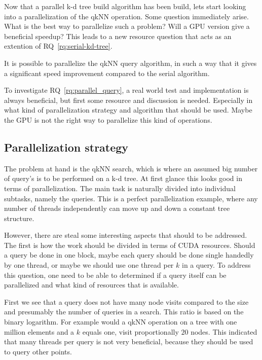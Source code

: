 





Now that a parallel k-d tree build algorithm has been build, lets start looking into a parallelization of the qkNN operation. Some question immediately arise. What is the best way to parallelize such a problem? Will a GPU version give a beneficial speedup? This leads to a new resource question that acts as an extention of RQ~\ref{rq:serial-kd-tree}.


\begin{myrq}
\label{rq:parallel_query}
    It is possible to parallelize the qkNN query algorithm, in such a way that it gives a significant speed improvement compared to the serial algorithm.
\end{myrq}


To investigate RQ~\ref{rq:parallel_query}, a real world test and implementation is always beneficial, but first some resource and discussion is needed. Especially in what kind of parallelization strategy and algorithm that should be used. Maybe the GPU is not the right way to parallelize this kind of operations.


\subsection{Parallelization strategy} %
\label{sub:parallelization_strategy}


The problem at hand is the qkNN search, which is where an assumed big number of query's is to be performed on a k-d tree. At first glance this looks good in terms of parallelization. The main task is naturally divided into individual subtasks, namely the queries. This is a perfect parallelization example, where any number of threads independently can move up and down a constant tree structure.

However, there are steal some interesting aspects that should to be addressed. The first is how the work should be divided in terms of CUDA resources. Should a query be done in one block, maybe each query should be done single handedly by one thread, or maybe we should use one thread per $k$ in a query. To address this question, one need to be able to determined if a query itself can be parallelized and what kind of resources that is available.

First we see that a query does not have many node visits compared to the size and presumably the number of queries in a search. This ratio is based on the binary logarithm. For example would a qkNN operation on a tree with one million elements and a $k$ equals one, visit proportionally $20$ nodes. This indicated that many threads per query is not very beneficial, because they should be used to query other points. 

